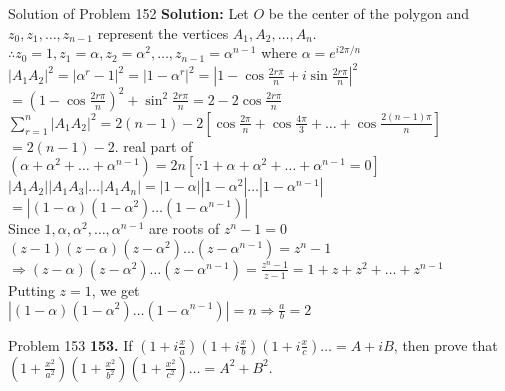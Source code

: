 \documentclass[aspectratio=169,8pt]{beamer}
\begin{document}
\begin{frame}{Solution of Problem 152}
  \textbf{Solution:} Let $O$ be the center of the polygon and $z_0, z_1, \ldots, z_{n - 1}$ represent the vertices $A_1, A_2,
  \ldots, A_n$.\\
  \vspace*{0.2cm}
  $\therefore z_0 = 1, z_1 = \alpha, z_2 = \alpha^2, \ldots, z_{n - 1} = \alpha^{n - 1}$ where $\alpha = e^{i2\pi/n}$\\
  \vspace*{0.2cm}
  $|A_1A_2|^2 =|\alpha^r - 1|^2 = |1 - \alpha^r|^2 = \left|1 - \cos\frac{2r\pi}{n} + i\sin\frac{2r\pi}{n}\right|^2$\\
  \vspace*{0.2cm}
  $= \left(1 - \cos\frac{2r\pi}{n}\right)^2 + \sin^2\frac{2r\pi}{n} = 2 - 2\cos\frac{2r\pi}{n}$\\
  \vspace*{0.2cm}
  $\sum_{r=1}^n |A_1A_2|^2 = 2(n - 1) - 2\left[\cos\frac{2\pi}{n} + \cos\frac{4\pi}{3} + \ldots + \cos\frac{2(n -
      1)\pi}{n}\right]$\\
  \vspace*{0.2cm}
  $= 2(n - 1) -2.$ real part of $(\alpha + \alpha^2 + \ldots + \alpha^{n - 1}) = 2n [\because 1 + \alpha + \alpha^2 + \ldots +
    \alpha^{n - 1} = 0]$\\
  \vspace*{0.2cm}
  $|A_1A_2||A_1A_3|\ldots |A_1A_n| = |1 - \alpha||1 - \alpha^2|\ldots|1 - \alpha^{n - 1}|$\\
  \vspace*{0.2cm}
  $= |(1 - \alpha)(1 - \alpha^2)\ldots(1 - \alpha^{n - 1})|$\\
  Since $1, \alpha, \alpha^2, \ldots, \alpha^{n - 1}$ are roots of $z^n - 1 = 0$\\
  \vspace*{0.2cm}
  $(z - 1)(z - \alpha)(z - \alpha^2)\ldots(z - \alpha^{n - 1}) = z^n - 1$\\
  \vspace*{0.2cm}
  $\Rightarrow (z - \alpha)(z - \alpha^2)\ldots(z - \alpha^{n - 1}) = \frac{z^n - 1}{z - 1} = 1 + z + z^2 + \ldots + z^{n - 1}$\\
  \vspace*{0.2cm}
  Putting $z = 1$, we get\\
  \vspace*{0.2cm}
  $|(1 - \alpha)(1 - \alpha^2)\ldots(1 - \alpha^{n - 1})| = n \Rightarrow \frac{a}{b} = 2$
\end{frame}
\begin{frame}{Problem 153}
  \textbf{153.} If $\left(1 + i\frac{x}{a}\right)\left(1+ i\frac{x}{b}\right)\left(1 + i\frac{x}{c}\right)\ldots = A + iB$, then
  prove that $\left(1 + \frac{x^2}{a^2}\right)\left(1 + \frac{x^2}{b^2}\right)\left(1 + \frac{x^2}{c^2}\right)\ldots = A^2 + B^2$.
\end{frame}
\end{document}

